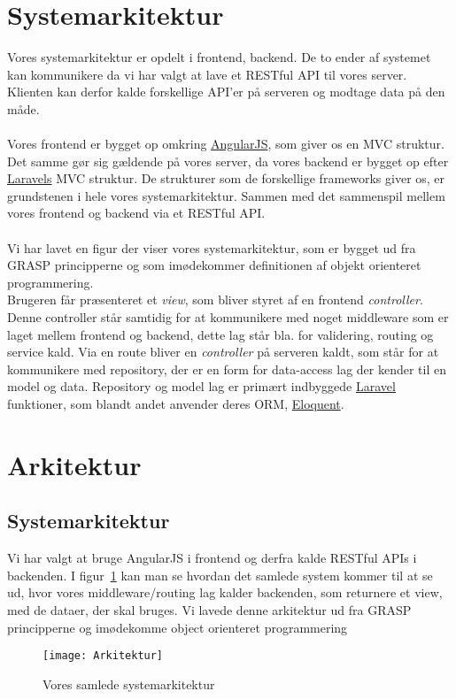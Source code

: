 \section{Systemarkitektur}
Vores systemarkitektur er opdelt i frontend, backend.
De to ender af systemet kan kommunikere da vi har valgt at lave et RESTful API til vores server.
Klienten kan derfor kalde forskellige API'er på serveren og modtage data på den måde.
\\\\
Vores frontend er bygget op omkring \hyperlink{AngularJS}{AngularJS}, som giver os en MVC struktur.
Det samme gør sig gældende på vores server, da vores backend er bygget op efter \hyperlink{Laravel}{Laravels} MVC struktur.
De strukturer som de forskellige frameworks giver os, er grundstenen i hele vores systemarkitektur. Sammen med det sammenspil mellem vores frontend og backend via et RESTful API.\@
\\\\
Vi har lavet en figur der viser vores systemarkitektur, som er bygget ud fra GRASP principperne og som imødekommer definitionen af objekt orienteret programmering.\\
Brugeren får præsenteret et \textit{view}, som bliver styret af en frontend \textit{controller}. Denne controller står samtidig for at kommunikere med noget middleware som er laget mellem frontend og backend, dette lag står bla. for validering, routing og service kald. Via en route bliver en \textit{controller} på serveren kaldt, som står for at kommunikere med repository, der er en form for data-access lag der kender til en model og data. Repository og model lag er primært indbyggede \hyperlink{Laravel}{Laravel} funktioner, som blandt andet anvender deres ORM, \href{http://laravel.com/docs/5.1/eloquent}{Eloquent}.
\section{Arkitektur}
\subsection{Systemarkitektur}
Vi har valgt at bruge AngularJS i frontend og derfra kalde RESTful APIs i backenden. I figur~\ref{fig:arkitektur}
kan man se hvordan det samlede system kommer til at se ud, hvor vores middleware/routing lag kalder backenden,
som returnere et view, med de dataer, der skal bruges.
Vi lavede denne arkitektur ud fra GRASP principperne og imødekomme object orienteret programmering
\begin{figure}[here]
\texttt{[image: Arkitektur]}
\caption{Vores samlede systemarkitektur}
\label{fig:arkitektur}
\end{figure}
